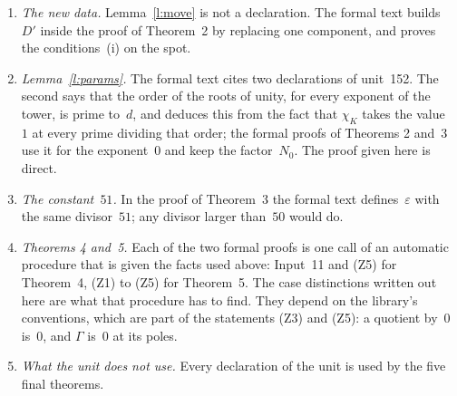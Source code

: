 \documentclass[11pt,a4paper]{article}
\theoremstyle{plainx}
\theoremstyle{uprightx}
\begin{document}
\begin{enumerate}[label=\textup{\arabic*.},leftmargin=1.6em,itemsep=5pt]
between two such exponents, which a decision procedure proves from the conditions~(i). The estimates in this note
are explicit, and they are mine; they use the same facts, which are the conditions (i) and~(ii), the definition
of~$\aD{D}$ and Input~5. Of Input~5 the formal proofs of this unit cite by name only the number of the tops; the
bounds for~$\cP{P}$ and the number of the infinite places enter through the calculus. All three statements were
read in the Lean text.
\item \emph{The new data.} Lemma~\ref{l:move} is not a declaration. The formal text builds $D'$ inside the proof of
Theorem~2 by replacing one component, and proves the conditions~(i) on the spot.
\item \emph{Lemma~\ref{l:params}.} The formal text cites two declarations of unit~152. The second says that the
order of the roots of unity, for every exponent of the tower, is prime to~$d$, and deduces this from the fact
that $\chi_K$ takes the value~$1$ at every prime dividing that order; the formal proofs of Theorems 2 and~3 use
it for the exponent~$0$ and keep the factor~$N_0$. The proof given here is direct.
\item \emph{The constant~$51$.} In the proof of Theorem~3 the formal text defines~$\varepsilon$ with the same
divisor~$51$; any divisor larger than~$50$ would do.
\item \emph{Theorems 4 and~5.} Each of the two formal proofs is one call of an automatic procedure that is given
the facts used above: Input~11 and (Z5) for Theorem~4, (Z1) to (Z5) for Theorem~5. The case distinctions written
out here are what that procedure has to find. They depend on the library's conventions, which are part of the
statements (Z3) and (Z5): a quotient by~$0$ is~$0$, and $\Gamma$ is~$0$ at its poles.
\item \emph{What the unit does not use.} Every declaration of the unit is used by the five final theorems.
\end{enumerate}
\end{document}
